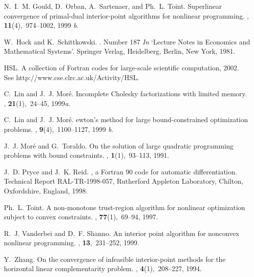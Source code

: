 \documentclass[twoside]{article}
\begin{document}
\begin{thebibliography}{xx}
N.~I.~M. Gould, D.~Orban, A.~Sartenaer, and Ph.~L. Toint.
\newblock Superlinear convergence of primal-dual interior-point algorithms for
  nonlinear programming.
, {\bf 11}(4),~974--1002, 1999{\em
  b}.

W.~Hock and K.~Schittkowski.
.
\newblock Number 187 {\em In} `Lecture Notes in Economics and Mathematical
  Systems'. Springer Verlag, Heidelberg, Berlin, New York, 1981.

HSL.
\newblock A collection of {F}ortran codes for large-scale scientific
  computation, 2002.
\newblock See http://www.cse.clrc.ac.uk/Activity/HSL.

C.~Lin and J.~J. Mor\'{e}.
\newblock Incomplete {C}holesky factorizations with limited memory.
, {\bf 21}(1),~24--45,
  1999{\em a}.

C.~Lin and J.~J. Mor\'{e}.
ewton's method for large bound-constrained optimization problems.
, {\bf 9}(4),~1100--1127, 1999{\em
  b}.

J.~J. Mor\'{e} and G.~Toraldo.
\newblock On the solution of large quadratic programming problems with bound
  constraints.
, {\bf 1}(1),~93--113, 1991.

J.~D. Pryce and J.~K. Reid.
, a {F}ortran 90 code for automatic differentiation.
\newblock Technical Report RAL-TR-1998-057, Rutherford Appleton Laboratory,
  Chilton, Oxfordshire, England, 1998.

Ph.~L. Toint.
\newblock A non-monotone trust-region algorithm for nonlinear optimization
  subject to convex constraints.
, {\bf 77}(1),~69--94, 1997.

R.~J. Vanderbei and D.~F. Shanno.
\newblock An interior point algorithm for nonconvex nonlinear programming.
, {\bf
  13},~231--252, 1999.

Y.~Zhang.
\newblock On the convergence of infeasible interior-point methods for the
  horizontal linear complementarity problem.
, {\bf 4}(1),~208--227, 1994.

\end{thebibliography}
\end{document}
